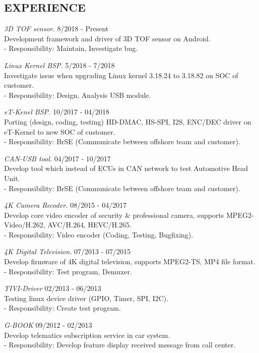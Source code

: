 \documentclass[margin]{res}
\begin{document}
\begin{resume}
\section{EXPERIENCE}
                {\sl 3D TOF sensor.} \hfill            8/2018 - Present \\
		 Development framework and driver of 3D TOF sensor on Android.\\
		 - Responsibility: Maintain, Investigate bug.


                {\sl Linux Kernel BSP.} \hfill            5/2018 - 7/2018 \\
		 Investigate issue when upgrading Linux kernel 3.18.24 to 3.18.82 on SOC of customer.\\
		 - Responsibility: Design, Analysis USB module.

                {\sl eT-Kenel BSP.} \hfill            10/2017 - 04/2018 \\
		 Porting (design, coding, testing) HD-DMAC, HS-SPI, I2S, ENC/DEC driver on eT-Kernel to new SOC of customer.\\
		 - Responsibility: BrSE (Communicate between offshore team and customer).


                {\sl CAN-USB tool.} \hfill            04/2017 - 10/2017 \\
		 Develop tool which instead of ECUs in CAN network to test Automotive Head Unit.\\
		 - Responsibility: BrSE (Communicate between offshore team and customer).

                {\sl 4K Camera Recoder.} \hfill            08/2015 - 04/2017 \\
		 Develop core video encoder of security \& professional camera, supports MPEG2-Video/H.262, AVC/H.264, HEVC/H.265.\\
		 - Responsibility: Video encoder (Coding, Testing, Bugfixing).
   

                {\sl 4K Digital Television.} \hfill            07/2013 - 07/2015 \\
		 Develop firmware of 4K digital television, supports MPEG2-TS, MP4 file format.\\
		 - Responsibility: Test program, Demuxer.

                {\sl TIVI-Driver} \hfill            02/2013 - 06/2013 \\
		 Testing linux device driver (GPIO, Timer, SPI, I2C).\\
		 - Responsibility: Create test program.

                {\sl G-BOOK} \hfill            09/2012 - 02/2013 \\
		 Develop telematics subscription service in car system.\\
		 - Responsibility: Develop feature display received message from call center.



\end{resume}
\end{document}
